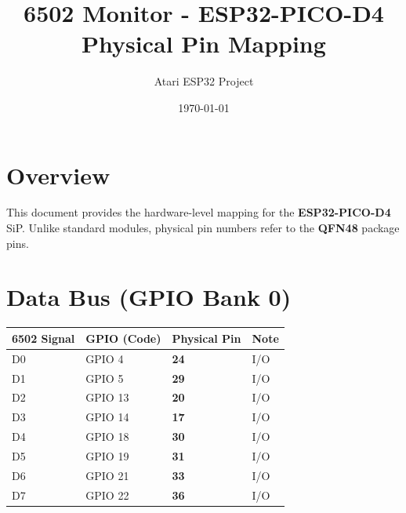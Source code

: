 \documentclass[a4paper,10pt]{article}
\title{6502 Monitor - ESP32-PICO-D4 Physical Pin Mapping}
\author{Atari ESP32 Project}
\date{\today}
\begin{document}
\maketitle

\section{Overview}
This document provides the hardware-level mapping for the \textbf{ESP32-PICO-D4} SiP. Unlike standard modules, physical pin numbers refer to the \textbf{QFN48} package pins.

\section{Data Bus (GPIO Bank 0)}
\begin{table}[h!]
\centering
\begin{tabular}{@{}llll@{}}
\toprule
\textbf{6502 Signal} & \textbf{GPIO (Code)} & \textbf{Physical Pin} & \textbf{Note} \\ \midrule
D0                   & GPIO 4              & \textbf{24}          & I/O           \\
D1                   & GPIO 5              & \textbf{29}          & I/O           \\
D2                   & GPIO 13             & \textbf{20}          & I/O           \\
D3                   & GPIO 14             & \textbf{17}          & I/O           \\
D4                   & GPIO 18             & \textbf{30}          & I/O           \\
D5                   & GPIO 19             & \textbf{31}          & I/O           \\
D6                   & GPIO 21             & \textbf{33}          & I/O           \\
D7                   & GPIO 22             & \textbf{36}          & I/O           \\ \bottomrule
\end{tabular}
\end{table}
\end{document}
